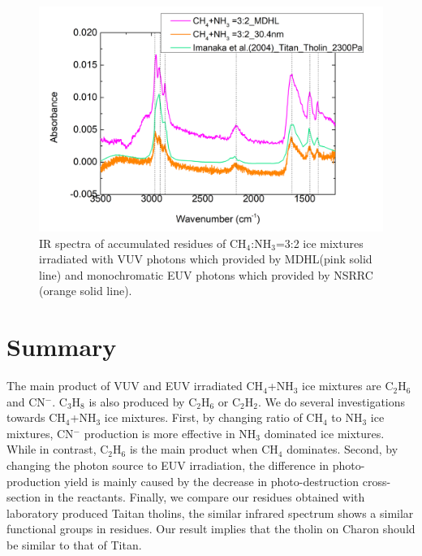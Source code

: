 \begin{figure}
\centering
\includegraphics[width=\textwidth]{figures/chapter3/residue.png}
\caption{IR spectra of accumulated residues of CH$_4$:NH$_3$=3:2 ice mixtures irradiated with VUV photons which provided by MDHL(pink solid line) and  monochromatic EUV photons which provided by NSRRC (orange solid line).}
\label{fig:residues}
\end{figure}


\section{Summary} %

The main product of VUV and EUV irradiated CH$_4$+NH$_3$ ice mixtures are C$_2$H$_6$ and CN$^-$. C$_3$H$_8$ is also produced by C$_2$H$_6$ or C$_2$H$_2$. We do several investigations towards CH$_4$+NH$_3$ ice mixtures. First, by changing ratio of CH$_4$ to NH$_3$ ice mixtures, CN$^-$ production is more effective in NH$_3$ dominated ice mixtures. While in contrast, C$_2$H$_6$ is the main product when CH$_4$ dominates. Second, by changing the photon source to EUV irradiation, the difference in photo-production yield is mainly caused by the decrease in photo-destruction cross-section in the reactants. Finally, we compare our residues obtained with laboratory produced Taitan tholins, the similar infrared spectrum shows a similar functional groups in residues. Our result implies that the tholin on Charon should be similar to that of Titan.


